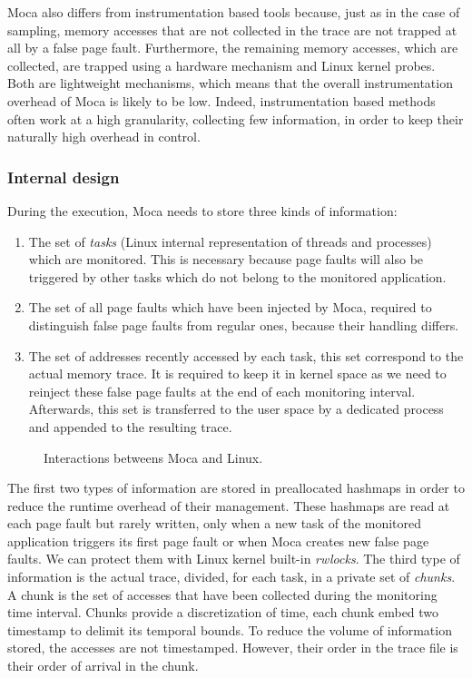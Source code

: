 \gls{Moca} also differs from instrumentation based tools because, just as in the case of sampling, memory accesses that are not collected in the trace are not trapped at all by a false page fault.
Furthermore, the remaining memory accesses, which are collected, are trapped using a hardware mechanism and Linux kernel probes.
Both are lightweight mechanisms, which means that the overall instrumentation overhead of \gls{Moca} is likely to be low.
Indeed, instrumentation based methods often work at a high granularity, collecting few information, in order to keep their naturally high overhead in control.

\subsubsection{Internal design}

During the execution, \gls{Moca} needs to store three kinds of information:

\begin{enumerate}
    \item The set of \emph{tasks} (Linux internal representation of threads and processes) which are
monitored.
    This is necessary because page faults will also be triggered by other tasks which do not belong to
    the monitored application.
    \item The set of all page faults which have been injected by \gls{Moca}, required to distinguish false page faults from regular ones, because their handling differs.
    \item The set of addresses recently accessed by each task, this set correspond to the actual memory trace.
        It is required to keep it in kernel space as we need to reinject these false page faults at the end of each monitoring interval.
        Afterwards, this set is transferred to the user space by a dedicated process and appended to the resulting trace.
\end{enumerate}

\begin{figure}[htb]
    \centering
    
    \caption{Interactions betweens Moca and Linux.}
    \label{fig:moca}
\end{figure}

The first two types of information are stored in preallocated hashmaps in order to reduce the runtime overhead of their management.
These hashmaps are read at each page fault but rarely written, only when a new task of the monitored application triggers its first page fault or when \gls{Moca} creates new false page faults.
We can protect them with Linux kernel built-in \emph{rwlocks}.
The third type of information is the actual trace, divided, for each task, in a private set of \emph{chunks}.
A chunk is the set of accesses that have been collected during the monitoring time interval.
Chunks provide a discretization of time, each chunk embed two timestamp to delimit its temporal bounds.
To reduce the volume of information stored, the accesses are not timestamped.
However, their order in the trace file is their order of arrival in the chunk.

